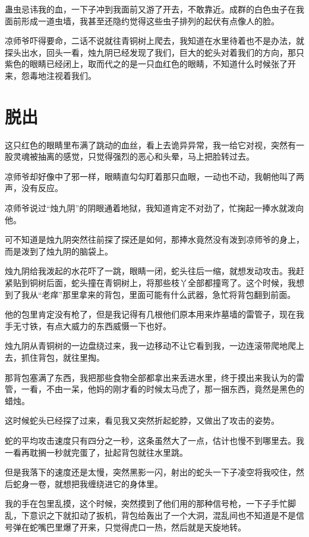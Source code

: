 蛊虫忌讳我的血，一下子冲到我面前又游了开去，不敢靠近。成群的白色虫子在我面前形成一道虫墙，我甚至还隐约觉得这些虫子排列的起伏有点像人的脸。

凉师爷吓得要命，二话不说就往青铜树上爬去，我知道在水里待着也不是办法，就探头出水，回头一看，烛九阴已经发现了我们，巨大的蛇头对着我们的方向，那只紫色的眼睛已经闭上，取而代之的是一只血红色的眼睛，不知道什么时候张了开来，怨毒地注视着我们。

\chapter{脱出}

这只红色的眼睛里布满了跳动的血丝，看上去诡异异常，我一给它对视，突然有一股灵魂被抽离的感觉，只觉得强烈的恶心和头晕，马上把脸转过去。

凉师爷却好像中了邪一样，眼睛直勾勾盯着那只血眼，一动也不动，我朝他叫了两声，没有反应。

凉师爷说过“烛九阴”的阴眼通着地狱，我知道肯定不对劲了，忙掬起一捧水就泼向他。

可不知道是烛九阴突然往前探了探还是如何，那捧水竟然没有泼到凉师爷的身上，而是泼到了烛九阴的脑袋上。

烛九阴给我泼起的水花吓了一跳，眼睛一闭，蛇头往后一缩，就想发动攻击。我赶紧贴到铜树后面，蛇头撞在青铜树上，将那些枝丫全部都撞弯了。这个时候，我想到了我从“老痒”那里拿来的背包，里面可能有什么武器，急忙将背包翻到前面。

他的包里肯定没有枪了，但是我记得有几根他们原本用来炸墓墙的雷管子，现在我手无寸铁，有点大威力的东西威慑一下也好。

烛九阴从青铜树的一边盘绕过来，我一边移动不让它看到我，一边连滚带爬地爬上去，抓住背包，就往里掏。

那背包塞满了东西，我把那些食物全部都拿出来丢进水里，终于摸出来我认为的雷管，一看，不由一呆，他妈的刚才看的时候太马虎了，那一捆东西，竟然是黑色的蜡烛。

这时候蛇头已经探了过来，看见我又突然折起蛇脖，又做出了攻击的姿势。

蛇的平均攻击速度只有四分之一秒，这条虽然大了一点，估计也慢不到哪里去。我一看再耽搁一秒就完蛋了，扯起背包就往水里跳。

但是我落下的速度还是太慢，突然黑影一闪，射出的蛇头一下子凌空将我咬住，然后蛇身一卷，就想把我缠绕进它的身体里。

我的手在包里乱摸，这个时候，突然摸到了他们用的那种信号枪，一下子手忙脚乱，下意识之下就扣动了扳机，背包给轰出了一个大洞，混乱间也不知道是不是信号弹在蛇嘴巴里爆了开来，只觉得虎口一热，然后就是天旋地转。

